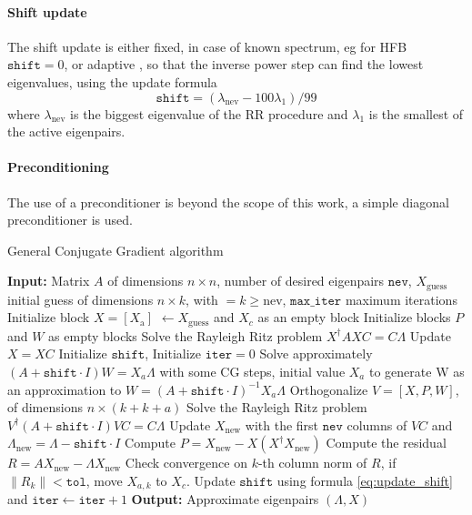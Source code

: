 \paragraph{Shift update} The shift update is either fixed, in case of known spectrum, eg for HFB $\texttt{shift} = 0$, or adaptive \cite{GCG1}, so that the inverse power step can find the lowest eigenvalues, using the update formula
\begin{equation}
    \label{eq:update_shift}
    \texttt{shift}=(\lambda_\text{nev} - 100\lambda_1)/99
\end{equation}
where $\lambda_\text{nev}$ is the biggest eigenvalue of the RR procedure and $\lambda_1$ is the smallest of the active eigenpairs.
\paragraph{Preconditioning} The use of a preconditioner is beyond the scope of this work, a simple diagonal preconditioner is used.
\begin{algorithm}[h]
\caption{General Conjugate Gradient algorithm}
\begin{algorithmic}[1]
    \label{alg:mod_gcg}
\STATE \textbf{Input:} Matrix \(A\) of dimensions $n\times n$, number of desired eigenpairs \( \texttt{nev} \), $X_\text{guess}$ initial guess of dimensions $n\times k$, with $= k \ge \text{nev}$, \(\texttt{max\_iter}\) maximum iterations
\STATE Initialize block $X=[ X_\text{a}]$ $\gets X_\text{guess}$ and $X_c$ as an empty block
\STATE Initialize blocks \( P \) and \( W \) as empty blocks
\STATE Solve the Rayleigh Ritz problem \(X^\dagger A X C= C \Lambda \)
\STATE Update \(X=X C\)
\STATE Initialize $\texttt{shift}$, Initialize $\texttt{iter} = 0$ 
    \STATE Solve approximately \( (A+ \texttt{shift}\cdot I)W = X_a\Lambda \) with some CG steps, initial value $X_a$ to generate W as an approximation to $W = (A+\texttt{shift}\cdot I)^{-1}X_a\Lambda$ \label{alg:inv_pow_step} 
    \STATE Orthogonalize \( V=[X, P, W] \), of dimensions $n\times (k+k+a)$
    \STATE Solve the Rayleigh Ritz problem \(V^\dagger (A + \texttt{shift}\cdot I) V C= C\Lambda \)
    \STATE Update \(X_\text{new}\) with the first $\texttt{nev}$ columns of $VC$ and \(\Lambda_\text{new} = \Lambda - \texttt{shift}\cdot I\)
    \STATE Compute \(P=X_\text{new} - X(X^\dagger X_\text{new})\) \label{alg:directions}
    \STATE Compute the residual \( R = AX_\text{new} - \Lambda X_\text{new} \) 
    \STATE Check convergence on $k$-th column norm of \(R\), if $\|R_k\| < \texttt{tol}$, move \(X_{a,k}\) to \(X_c\).
    \STATE Update $\texttt{shift}$ using formula \eqref{eq:update_shift} and $\texttt{iter}\gets \texttt{iter} + 1$
\ENDWHILE
\STATE \textbf{Output:} Approximate eigenpairs \( (\Lambda, X) \)
\end{algorithmic}
\end{algorithm}


